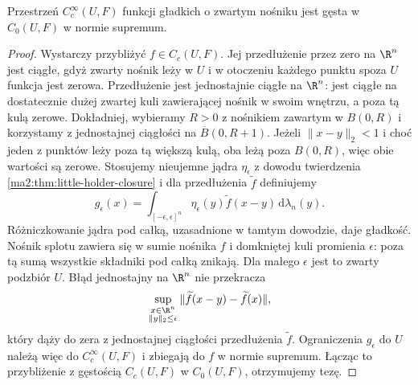 \begin{wniosek}
\label{ma2:cor:c0-smooth-density}
Przestrzeń $C_c^\infty(U,F)$ funkcji gładkich
o zwartym nośniku jest gęsta w $C_0(U,F)$
w normie supremum.
\end{wniosek}
\begin{proof}
Wystarczy przybliżyć $f\in C_c(U,F)$.
Jej przedłużenie przez zero na $\R^n$
jest ciągłe, gdyż zwarty nośnik leży
w $U$ i w otoczeniu każdego punktu
spoza $U$ funkcja jest zerowa.
Przedłużenie jest jednostajnie ciągłe
na $\R^n$: jest ciągłe na dostatecznie
dużej zwartej kuli zawierającej nośnik
w swoim wnętrzu, a poza tą kulą zerowe.
Dokładniej, wybieramy $R>0$ z nośnikiem
zawartym w $B(0,R)$ i korzystamy z jednostajnej
ciągłości na $\overline B(0,R+1)$.
Jeżeli $\|x-y\|_2<1$ i choć jeden z punktów
leży poza tą większą kulą, oba leżą poza
$B(0,R)$, więc obie wartości są zerowe.
Stosujemy nieujemne jądra
$\eta_\epsilon$ z dowodu twierdzenia
\ref{ma2:thm:little-holder-closure}
i dla przedłużenia $\widetilde f$ definiujemy
\[
 g_\epsilon(x)=\int_{[-\epsilon,\epsilon]^n}
 \eta_\epsilon(y)\widetilde f(x-y)\,
                         \mathrm d\lambda_n(y).
\]
Różniczkowanie jądra pod całką, uzasadnione
w tamtym dowodzie, daje gładkość.
Nośnik splotu zawiera się w sumie
nośnika $f$ i domkniętej kuli
promienia $\epsilon$: poza tą sumą
wszystkie składniki pod całką znikają.
Dla małego $\epsilon$ jest to zwarty
podzbiór $U$. Błąd jednostajny na $\R^n$ nie przekracza
\[
 \sup_{\substack{x\in\R^n\\\|y\|_2\le\epsilon}}
 \|\widetilde f(x-y)-\widetilde f(x)\|,
\]
który dąży do zera z jednostajnej ciągłości
przedłużenia $\widetilde f$.
Ograniczenia $g_\epsilon$ do $U$ należą więc
do $C_c^\infty(U,F)$ i zbiegają do $f$
w normie supremum. Łącząc to przybliżenie
z gęstością $C_c(U,F)$ w $C_0(U,F)$,
otrzymujemy tezę.
\end{proof}


